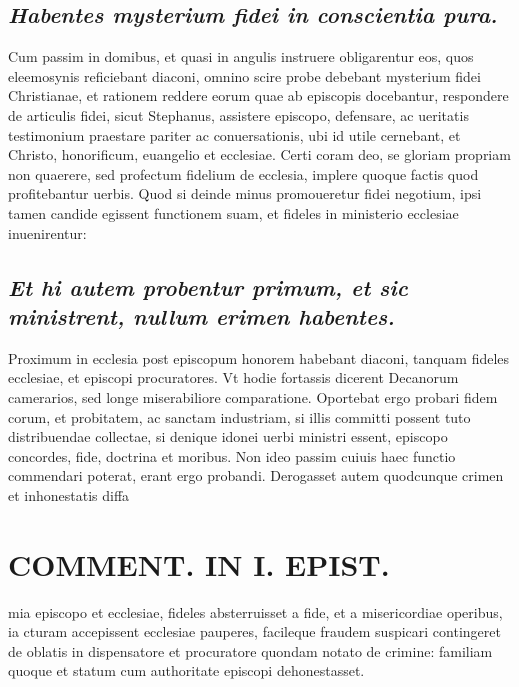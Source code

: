 \documentclass{article}
\begin{document}
\begin{pages}
\subsection*{\textit{Habentes mysterium fidei in conscientia pura. }}\pstart Cum passim in domibus, et quasi in angulis instruere obligarentur eos, quos eleemosynis reficiebant diaconi, omnino scire probe debebant mysterium fidei Christianae, et rationem reddere eorum quae ab episcopis docebantur, respondere de articulis fidei, sicut Stephanus, assistere episcopo, defensare, ac ueritatis testimonium praestare pariter ac conuersationis, ubi id utile cernebant, et Christo, honorificum, euangelio et ecclesiae. Certi coram deo, se gloriam propriam non quaerere, sed profectum fidelium de ecclesia, implere quoque factis quod profitebantur uerbis. Quod si deinde minus promoueretur fidei negotium, ipsi tamen candide egissent functionem suam, et fideles in ministerio ecclesiae inuenirentur:  \pend
{}
{}
\subsection*{\textit{Et hi autem probentur primum, et sic ministrent, nullum erimen habentes. }}\pstart Proximum in ecclesia post episcopum honorem habebant diaconi, tanquam fideles ecclesiae, et episcopi procuratores. Vt hodie fortassis dicerent Decanorum camerarios, sed longe miserabiliore comparatione. Oportebat ergo probari fidem corum, et probitatem, ac sanctam industriam, si illis committi possent tuto distribuendae collectae, si denique idonei uerbi ministri essent, episcopo concordes, fide, doctrina et moribus. Non ideo passim cuiuis haec functio commendari poterat, erant ergo probandi. Derogasset autem quodcunque crimen et inhonestatis diffa\pend
\section*{COMMENT. IN I. EPIST. }
\marginpar{[ p.500 ]}\pstart mia episcopo et ecclesiae, fideles absterruisset a fide, et a misericordiae operibus, ia cturam accepissent ecclesiae pauperes, facileque fraudem suspicari contingeret de oblatis in dispensatore et procuratore quondam notato de crimine: familiam quoque  et statum cum authoritate episcopi dehonestasset.  \pend
{}
{}

\end{pages}
\end{document}
